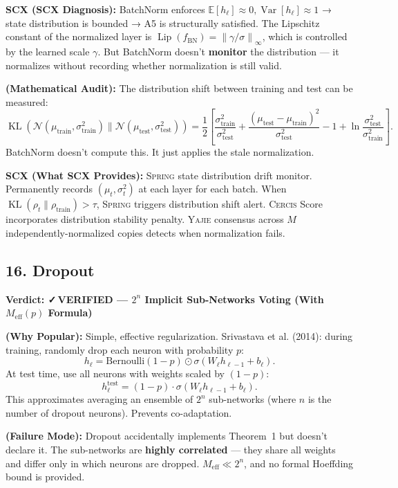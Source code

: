 \documentclass[12pt,a4paper]{article}
\theoremstyle{definition}
\newcommand{\verified}{{\color{verifiedcolor}\textbf{✓\,VERIFIED}}}
\newcommand{\Yajie}{\textsc{Yajie}}
\newcommand{\Spring}{\textsc{Spring}}
\newcommand{\Cercis}{\textsc{Cercis}}
\DeclareMathOperator{\KL}{KL}
\DeclareMathOperator{\Var}{Var}
\DeclareMathOperator{\Lip}{Lip}
\newcommand{\E}{\mathbb{E}}
\newcommand{\cN}{\mathcal{N}}
\newcommand{\norm}[1]{\left\lVert#1\right\rVert}
\newcommand{\auditHeader}[1]{\medskip\noindent\textbf{\large #1}\medskip}
\newcommand{\whyPopular}{\noindent\textbf{ (Why Popular):} }
\newcommand{\whyFail}{\noindent\textbf{ (Failure Mode):} }
\newcommand{\whatMissing}{\noindent\textbf{SCX (What SCX Provides):} }
\newcommand{\diagnosis}{\noindent\textbf{SCX (SCX Diagnosis):} }
\newcommand{\mathAudit}{\noindent\textbf{ (Mathematical Audit):} }
\begin{document}
\diagnosis{} BatchNorm enforces $\E[h_\ell] \approx 0, \Var[h_\ell] \approx 1$ → state distribution is bounded → A5 is structurally satisfied. The Lipschitz constant of the normalized layer is $\Lip(f_{\text{BN}}) = \norm{\gamma / \sigma}_\infty$, which is controlled by the learned scale $\gamma$. But BatchNorm doesn't \textbf{monitor} the distribution — it normalizes without recording whether normalization is still valid.

\mathAudit{} The distribution shift between training and test can be measured:
\[
\KL(\cN(\mu_{\text{train}}, \sigma_{\text{train}}^2) \| \cN(\mu_{\text{test}}, \sigma_{\text{test}}^2)) = \frac{1}{2}\left[\frac{\sigma_{\text{train}}^2}{\sigma_{\text{test}}^2} + \frac{(\mu_{\text{test}} - \mu_{\text{train}})^2}{\sigma_{\text{test}}^2} - 1 + \ln\frac{\sigma_{\text{test}}^2}{\sigma_{\text{train}}^2}\right].
\]
BatchNorm doesn't compute this. It just applies the stale normalization.

\whatMissing{} \Spring{} state distribution drift monitor. Permanently records $(\mu_t, \sigma_t^2)$ at each layer for each batch. When $\KL(\rho_t \| \rho_{\text{train}}) > \tau$, \Spring{} triggers distribution shift alert. \Cercis{} Score incorporates distribution stability penalty. \Yajie{} consensus across $M$ independently-normalized copies detects when normalization fails.

\subsection{16. Dropout}

\auditHeader{Verdict: \verified{} — $2^n$ Implicit Sub-Networks Voting (With $M_{\text{eff}}(p)$ Formula)}

\whyPopular{} Simple, effective regularization. Srivastava et al. (2014): during training, randomly drop each neuron with probability $p$:
\[
h_\ell = \text{Bernoulli}(1-p) \odot \sigma(W_\ell h_{\ell-1} + b_\ell).
\]
At test time, use all neurons with weights scaled by $(1-p)$:
\[
h_\ell^{\text{test}} = (1-p) \cdot \sigma(W_\ell h_{\ell-1} + b_\ell).
\]
This approximates averaging an ensemble of $2^n$ sub-networks (where $n$ is the number of dropout neurons). Prevents co-adaptation.

\whyFail{} Dropout accidentally implements Theorem~1 but doesn't declare it. The sub-networks are \textbf{highly correlated} — they share all weights and differ only in which neurons are dropped. $M_{\text{eff}} \ll 2^n$, and no formal Hoeffding bound is provided.
\end{document}
